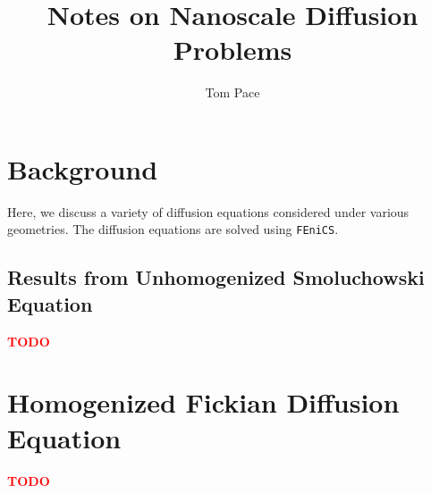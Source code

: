 \documentclass{article}
\begin{document}
\title{Notes on Nanoscale Diffusion Problems}
\author{Tom Pace}
\maketitle

\tableofcontents

\section{Background}\label{sec:background}

Here, we discuss a variety of diffusion equations
considered under various geometries.
The diffusion equations are solved using \texttt{FEniCS}.











\subsection{Results from Unhomogenized Smoluchowski Equation}\label{subsec:res_unhom_smol}

\textcolor{red}{\textbf{TODO}}



\section{Homogenized Fickian Diffusion Equation}\label{sec:hom_fick}

\textcolor{red}{\textbf{TODO}}

\printbibliography
\end{document}
